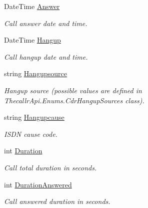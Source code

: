 \begin{DoxyCompactItemize}
Date\+Time \hyperlink{class_thecallr_api_1_1_objects_1_1_cdr_1_1_cdr_a792393dfcf53621bc1afe4c196bb8125}{Answer}
\begin{DoxyCompactList}\small\item\em Call answer date and time. \end{DoxyCompactList}\item 
Date\+Time \hyperlink{class_thecallr_api_1_1_objects_1_1_cdr_1_1_cdr_ad8e4ffb8e2851da0211728bb14d5b483}{Hangup}
\begin{DoxyCompactList}\small\item\em Call hangup date and time. \end{DoxyCompactList}\item 
string \hyperlink{class_thecallr_api_1_1_objects_1_1_cdr_1_1_cdr_a2d51198b5beb2aa54dea66ef3f79c9b6}{Hangupsource}
\begin{DoxyCompactList}\small\item\em Hangup source (possible values are defined in Thecallr\+Api.\+Enums.\+Cdr\+Hangup\+Sources class). \end{DoxyCompactList}\item 
string \hyperlink{class_thecallr_api_1_1_objects_1_1_cdr_1_1_cdr_aa3bfc9609582e77e9093b0834996cd91}{Hangupcause}
\begin{DoxyCompactList}\small\item\em I\+S\+D\+N cause code. \end{DoxyCompactList}\item 
int \hyperlink{class_thecallr_api_1_1_objects_1_1_cdr_1_1_cdr_ad0320e61db4b940615d5e14605e50bc8}{Duration}
\begin{DoxyCompactList}\small\item\em Call total duration in seconds. \end{DoxyCompactList}\item 
int \hyperlink{class_thecallr_api_1_1_objects_1_1_cdr_1_1_cdr_a81c5af1816a5aa69e050ca01e8080edc}{Duration\+Answered}
\begin{DoxyCompactList}\small\item\em Call answered duration in seconds. \end{DoxyCompactList}\item 

\end{DoxyCompactItemize}
